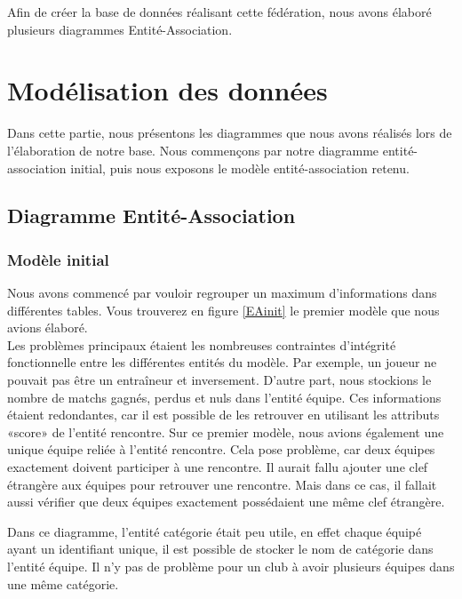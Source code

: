 \documentclass[a4paper,12pt]{article}
\begin{document}
Afin de créer la base de données réalisant cette fédération, nous avons élaboré plusieurs diagrammes Entité-Association.

\section{Modélisation des données}
Dans cette partie, nous présentons les diagrammes que nous avons réalisés lors de l'élaboration de notre base. Nous commençons par notre diagramme entité-association initial, puis nous exposons le modèle entité-association retenu.

\subsection{Diagramme Entité-Association}
\subsubsection{Modèle initial}
Nous avons commencé par vouloir regrouper un maximum d'informations dans différentes tables. Vous trouverez en figure \ref{EAinit} le premier modèle que nous avions élaboré.\\

Les problèmes principaux étaient les nombreuses contraintes d'intégrité fonctionnelle entre les différentes entités du modèle. Par exemple, un joueur ne pouvait pas être un entraîneur et inversement. D'autre part, nous stockions le nombre de matchs gagnés, perdus et nuls dans l'entité équipe. Ces informations étaient redondantes, car il est possible de les retrouver  en utilisant les attributs «score» de l'entité rencontre. Sur ce premier modèle, nous avions également une unique équipe reliée à l'entité rencontre. Cela pose problème, car deux équipes exactement doivent participer à une rencontre. Il aurait fallu ajouter une clef étrangère aux équipes pour retrouver une rencontre. Mais dans ce cas, il fallait aussi vérifier que deux équipes exactement possédaient une même clef étrangère.

Dans ce diagramme, l'entité catégorie était peu utile, en effet chaque équipé ayant un identifiant unique, il est possible de stocker le nom de catégorie dans l'entité équipe. Il n'y pas de problème pour un club à avoir plusieurs équipes dans une même catégorie.\\
\end{document}
